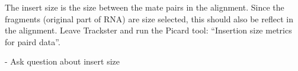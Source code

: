 \documentclass[11pt,a4paper]{article}
\begin{document}
The insert size is the size between the mate pairs in the alignment. Since the fragments (original part of RNA) are size selected, this should also be reflect in the alignment. Leave Trackster and run the Picard tool: ``Insertion size metrics for paird data''.

- Ask question about insert size

%
%


\vspace{-1.5em}

\end{document}
